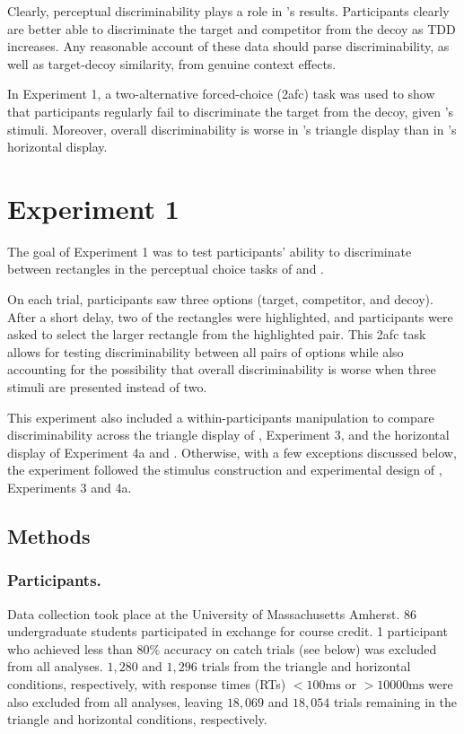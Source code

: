Clearly, perceptual discriminability plays a role in \textcite{spektorWhenGoodLooks2018b}'s results. Participants clearly are better able to discriminate the target and competitor from the decoy as TDD increases. Any reasonable account of these data should parse discriminability, as well as target-decoy similarity, from genuine context effects.

In Experiment 1, a two-alternative forced-choice (2afc) task was used to show that participants regularly fail to discriminate the target from the decoy, given \textcite{spektorWhenGoodLooks2018b}'s stimuli. Moreover, overall discriminability is worse in \textcite{spektorWhenGoodLooks2018b}'s triangle display than in \textcite{trueblood2013not}'s horizontal display.

\section{Experiment 1}

The goal of Experiment 1 was to test participants' ability to discriminate between rectangles in the perceptual choice tasks of \textcite{trueblood2013not} and \textcite{spektorWhenGoodLooks2018b}. 

On each trial, participants saw three options (target, competitor, and decoy). After a short delay, two of the rectangles were highlighted, and participants were asked to select the larger rectangle from the highlighted pair. This 2afc task allows for testing discriminability between all pairs of options while also accounting for the possibility that overall discriminability is worse when three stimuli are presented instead of two.

This experiment also included a within-participants manipulation to compare discriminability across the triangle display of \textcite{spektorWhenGoodLooks2018b}, Experiment 3, and the horizontal display of \textcite{spektorWhenGoodLooks2018b} Experiment 4a and \textcite{trueblood2013not}. Otherwise, with a few exceptions discussed below, the experiment followed the stimulus construction and experimental design of \textcite{spektorWhenGoodLooks2018b}, Experiments 3 and 4a. 

\subsection{Methods}

\subsubsection{Participants.}
Data collection took place at the University of Massachusetts Amherst. 86 undergraduate students participated in exchange for course credit. 1 participant who achieved less than $80\%$ accuracy on catch trials (see below) was excluded from all analyses. $1,280$ and $1,296$ trials from the triangle and horizontal conditions, respectively, with response times (RTs) $<100\text{ms}$ or $>10000\text{ms}$ were also excluded from all analyses, leaving $18,069$ and $18,054$ trials remaining in the triangle and horizontal conditions, respectively. 

